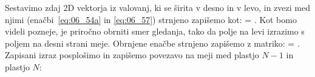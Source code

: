 Sestavimo zdaj 2D vektorja iz valovanj, ki se širita v desno in v levo, in zvezi
med njimi (enačbi~\ref{eq:06_54a} in \ref{eq:06_57}) strnjeno zapišemo kot:
\beq
\left[\begin{array}{c}
E_{2}\\
E_{2}'\\
\end{array}\right] =
\left[\begin{array}{cc}
1& r_{21}\\
r_{21}& 1\\
\end{array}\right]\cdot
{}\!\!.
\label{eq:06_58}
\eeq
Kot bomo videli pozneje, je priročno obrniti smer gledanja, tako da polje na 
levi izrazimo s poljem na desni strani meje. Obrnjene enačbe strnjeno zapišemo z matriko:
\beq
{} =
\left[\begin{array}{cc}
1& r_{12}\\
r_{12}& 1\\
\end{array}\right]\cdot
\left[\begin{array}{c}
E_2\\
E_2'\\
\end{array}\right]\!\!.
\label{eq:06_59}
\eeq
Zapisani izraz posplošimo in zapišemo povezavo na meji med plastjo 
$N-1$ in plastjo $N$:

